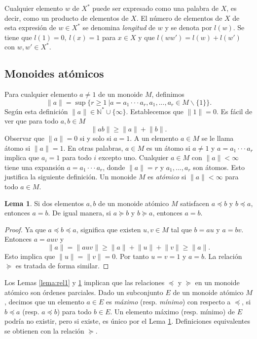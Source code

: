 \documentclass[12pt]{book}
\theoremstyle{definition}
\newtheorem{lema}{Lema}[section]
\providecommand{\norm}[1]{\lVert#1\rVert}
\begin{document}
Cualquier elemento $w$ de $X^*$ puede ser expresado como una palabra de $X$, es decir, como un producto de elementos de $X$. El número de elementos de $X$ de esta expresión de $w\in X^*$ se denomina \textit{longitud} de $w$ y se denota por $l(w)$. Se tiene que $l(1)=0,\ l(x)=1$ para $x\in X$ y que $l(ww')=l(w)+l(w')$ con $w,w'\in X^*$.
\label{monoide_libre}
\subsection{Monoides atómicos}

Para cualquier elemento $a\neq 1$ de un monoide $M$, definimos
$$\norm{a}=\sup\{r\geq 1\ | a=a_1\cdot\cdot\cdot a_r,a_1,...,a_r\in M\backslash \{1\}\}.$$
Según esta definición $\norm{a}\in \mathbb{N}^*\cup\{\infty\}$. Establecemos que $\norm{1}=0$. Es fácil de ver que para todo $a,b\in M$
$$\norm{ab}\geq\norm{a}+\norm{b}.$$
Observar que $\norm{a}=0$ si y solo si $a=1$. A un elemento $a\in M$ se le llama átomo si $\norm{a}=1$. En otras palabras, $a\in M$ es un átomo si $a\neq 1$ y $a=a_1\cdot\cdot\cdot a_r$ implica que $a_i=1$ para todo $i$ excepto uno. Cualquier $a\in M$ con $\norm{a} < \infty$ tiene una expansión $a=a_1\cdot\cdot\cdot a_r$, donde $\norm{a}=r$ y $a_1,...,a_r$ son átomos. Esto justifica la siguiente definición. Un monoide $M$ es \textit{atómico} si $\norm{a} < \infty$ para todo $a\in M$.

\begin{lema}
Si dos elementos $a,b$ de un monoide atómico $M$ satisfacen $a\preceq b$ y $b\preceq a$, entonces $a=b$. De igual manera, si $a\succeq b$ y $b\succeq a$, entonces $a=b$.
\label{lema:rel2}
\end{lema}

\begin{proof} Ya que $a\preceq b\preceq a$, significa que existen $u,v\in M$ tal que $b=au$ y $a=bv$. Entonces $a=auv$ y
$$\norm{a}=\norm{auv}\geq \norm{a}+\norm{u}+\norm{v}\geq \norm{a}.$$
Esto implica que $\norm{u}=\norm{v}=0$. Por tanto $u=v=1$ y $a=b$. La relación $\succeq$ es tratada de forma similar.
\end{proof}
Los Lemas \ref{lema:rel1} y \ref{lema:rel2} implican que las relaciones $\preceq$ y $\succeq$ en un monoide atómico son órdenes parciales. Dado un subconjunto $E$ de un monoide atómico $M$, decimos que un elemento $a\in E$ es \textit{máximo} (resp. \textit{mínimo}) con respecto a $\preceq$, si $b\preceq a$ (resp. $a\preceq b$) para todo $b\in E$. Un elemento máximo (resp. mínimo) de $E$ podría no existir, pero si existe, es único por el Lema \ref{lema:rel2}. Definiciones equivalentes se obtienen con la relación $\succeq$.
\end{document}
